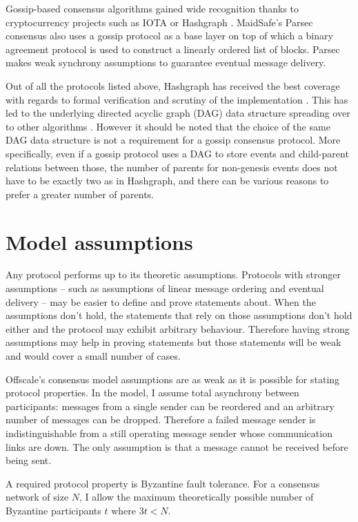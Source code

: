 \documentclass[a4paper,11pt]{article}
\begin{document}
Gossip-based consensus algorithms gained wide recognition thanks to cryptocurrency projects such as
IOTA or Hashgraph \cite{hashgraph}. MaidSafe's Parsec \cite{parsec} consensus also uses a gossip
protocol as a base layer on top of which a binary agreement protocol is used to construct a linearly
ordered list of blocks. Parsec makes weak synchrony assumptions to guarantee eventual message
delivery.

Out of all the protocols listed above, Hashgraph has received the best coverage with regards to
formal verification \cite{hashgraph-coq} and scrutiny of the implementation
\cite{hashgraph-fud}. This has led to the underlying directed acyclic graph (DAG) data structure
spreading over to other algorithms \cite{parsec, lachesis}. However it should be noted that the
choice of the same DAG data structure is not a requirement for a gossip consensus protocol. More
specifically, even if a gossip protocol uses a DAG to store events and child-parent relations
between those, the number of parents for non-genesis events does not have to be exactly two as in
Hashgraph, and there can be various reasons to prefer a greater number of parents.


\section{Model assumptions}

Any protocol performs up to its theoretic assumptions. Protocols with stronger assumptions -- such
as assumptions of linear message ordering and eventual delivery -- may be easier to define and prove
statements about. When the assumptions don't hold, the statements that rely on those assumptions
don't hold either and the protocol may exhibit arbitrary behaviour. Therefore having strong
assumptions may help in proving statements but those statements will be weak and would cover a small
number of cases.

Offscale's consensus model assumptions are as weak as it is possible for stating protocol
properties. In the model, I assume total asynchrony between participants: messages from a single
sender can be reordered and an arbitrary number of messages can be dropped. Therefore a failed
message sender is indistinguishable from a still operating message sender whose communication links
are down. The only assumption is that a message cannot be received before being sent.

A required protocol property is Byzantine fault tolerance. For a consensus network of size $N$, I
allow the maximum theoretically possible number of Byzantine participants $t$ where $3t < N$.
\end{document}

